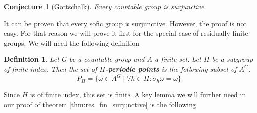 \documentclass[titlepage, a4paper]{article}
\newtheorem{definition}{Definition}
\newtheorem{conjecture}{Conjecture}
\theoremstyle{remark}
\begin{document}
    \begin{conjecture}[Gottschalk] \label{conj:gottschalk}
        Every countable group is surjunctive.
    \end{conjecture}

    It can be proven that every sofic group is surjunctive. However, the proof is not easy. For that reason we will prove it first for the special case of residually finite groups. We will need the following definition

    \begin{definition}
	    Let $G$ be a countable group and $A$ a finite set. Let $H$ be a subgroup of finite index. Then the set of \textbf{$H$-periodic points} is the following subset of $A^G$.
        \[
        P_H = \{ \omega \in A^G  \mid \forall h \in H: \sigma_h\omega = \omega\}
        \]
    \end{definition}

    Since $H$ is of finite index, this set is finite. %
    A key lemma we will further need in our proof of theorem \ref{thm:res_fin_surjunctive} is the following
\end{document}
